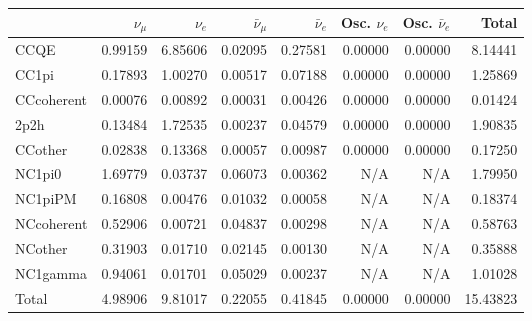\begin{tabular} { | l ||r | r | r | r | r | r | | r | }
\hline
              & $\nu_\mu$            & $\nu_e$              & $\bar{\nu}_{\mu}$    & $\bar{\nu}_{e}$      & Osc. $\nu_e$         & Osc. $\bar{\nu}_{e}$ & Total                \\ \hline\hline
 CCQE         & 0.99159              & 6.85606              & 0.02095              & 0.27581              & 0.00000              & 0.00000              & 8.14441              \\ \hline
 CC1pi        & 0.17893              & 1.00270              & 0.00517              & 0.07188              & 0.00000              & 0.00000              & 1.25869              \\ \hline
 CCcoherent   & 0.00076              & 0.00892              & 0.00031              & 0.00426              & 0.00000              & 0.00000              & 0.01424              \\ \hline
 2p2h         & 0.13484              & 1.72535              & 0.00237              & 0.04579              & 0.00000              & 0.00000              & 1.90835              \\ \hline
 CCother      & 0.02838              & 0.13368              & 0.00057              & 0.00987              & 0.00000              & 0.00000              & 0.17250              \\ \hline
 NC1pi0       & 1.69779              & 0.03737              & 0.06073              & 0.00362              & N/A                  & N/A                  & 1.79950              \\ \hline
 NC1piPM      & 0.16808              & 0.00476              & 0.01032              & 0.00058              & N/A                  & N/A                  & 0.18374              \\ \hline
 NCcoherent   & 0.52906              & 0.00721              & 0.04837              & 0.00298              & N/A                  & N/A                  & 0.58763              \\ \hline
 NCother      & 0.31903              & 0.01710              & 0.02145              & 0.00130              & N/A                  & N/A                  & 0.35888              \\ \hline
 NC1gamma     & 0.94061              & 0.01701              & 0.05029              & 0.00237              & N/A                  & N/A                  & 1.01028              \\ \hline
\hline
 Total        & 4.98906              & 9.81017              & 0.22055              & 0.41845              & 0.00000              & 0.00000              & 15.43823             \\ \hline

\end{tabular}
